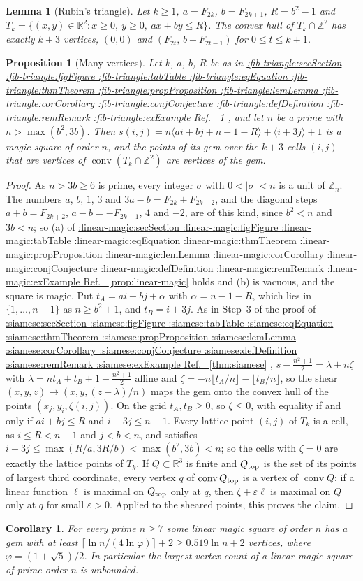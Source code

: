 \documentclass[11pt,a4paper]{article}
\makeatletter
\def\Cref@getprefix#1:#2\relax{#1}
\def\Cref@prefix@sec{sec}
\def\Cref@prefix@fig{fig}
\def\Cref@prefix@tab{tab}
\def\Cref@prefix@eq{eq}
\def\Cref@prefix@thm{thm}
\def\Cref@prefix@prop{prop}
\def\Cref@prefix@lem{lem}
\def\Cref@prefix@cor{cor}
\def\Cref@prefix@conj{conj}
\def\Cref@prefix@def{def}
\def\Cref@prefix@rem{rem}
\def\Cref@prefix@ex{ex}
\def\Cref@type@cap#1{%
  \edef\Cref@tmp{#1}%
  \ifx\Cref@tmp\Cref@prefix@sec Section%
  \else\ifx\Cref@tmp\Cref@prefix@fig Figure%
  \else\ifx\Cref@tmp\Cref@prefix@tab Table%
  \else\ifx\Cref@tmp\Cref@prefix@eq Equation%
  \else\ifx\Cref@tmp\Cref@prefix@thm Theorem%
  \else\ifx\Cref@tmp\Cref@prefix@prop Proposition%
  \else\ifx\Cref@tmp\Cref@prefix@lem Lemma%
  \else\ifx\Cref@tmp\Cref@prefix@cor Corollary%
  \else\ifx\Cref@tmp\Cref@prefix@conj Conjecture%
  \else\ifx\Cref@tmp\Cref@prefix@def Definition%
  \else\ifx\Cref@tmp\Cref@prefix@rem Remark%
  \else\ifx\Cref@tmp\Cref@prefix@ex Example%
  \else Ref.%
  \fi\fi\fi\fi\fi\fi\fi\fi\fi\fi\fi\fi
}
\DeclareRobustCommand{\Cref}[1]{%
  \begingroup
  \edef\Cref@label{#1}%
  \edef\Cref@prefix{\expandafter\Cref@getprefix\Cref@label:\relax}%
  \hyperref[#1]{\Cref@type@cap{\Cref@prefix}~\ref*{#1}}%
  \endgroup
}
\theoremstyle{plain}
\newtheorem{lemma}[theorem]{Lemma}
\newtheorem{proposition}[theorem]{Proposition}
\newtheorem{corollary}[theorem]{Corollary}
\theoremstyle{definition}
\theoremstyle{remark}
\newcommand{\R}{\mathbb{R}}
\newcommand{\Z}{\mathbb{Z}}
\makeatother
\begin{document}
\begin{lemma}[Rubin's triangle]
\label{lem:fib-triangle}
Let $k\ge1$, $a=F_{2k}$, $b=F_{2k+1}$, $R=b^2-1$ and $T_k=\{(x,y)\in\R^2:x\ge0,\ y\ge0,\ ax+by\le R\}$.
The convex hull of $T_k\cap\Z^2$ has exactly $k+3$ vertices, $(0,0)$ and $(F_{2t},\,b-F_{2t-1})$ for $0\le t\le k+1$.
\end{lemma}

\begin{proposition}[Many vertices]
\label{prop:many-vertices}
Let $k$, $a$, $b$, $R$ be as in \Cref{lem:fib-triangle}, and let $n$ be a prime with $n>\max(b^2,3b)$.
Then $s(i,j)=n\langle ai+bj+n-1-R\rangle+\langle i+3j\rangle+1$ is a magic square of order $n$, and the points of its gem over the $k+3$ cells $(i,j)$ that are vertices of $\operatorname{conv}(T_k\cap\Z^2)$ are vertices of the gem.
\end{proposition}

\begin{proof}
As $n>3b\ge6$ is prime, every integer $\sigma$ with $0<|\sigma|<n$ is a unit of $\Z_n$.
The numbers $a$, $b$, $1$, $3$ and $3a-b=F_{2k}+F_{2k-2}$, and the diagonal steps $a+b=F_{2k+2}$, $a-b=-F_{2k-1}$, $4$ and $-2$, are of this kind, since $b^2<n$ and $3b<n$; so (a) of \Cref{prop:linear-magic} holds and (b) is vacuous, and the square is magic.
Put $t_A=ai+bj+\alpha$ with $\alpha=n-1-R$, which lies in $\{1,\dots,n-1\}$ as $n\ge b^2+1$, and $t_B=i+3j$.
As in Step~3 of the proof of \Cref{thm:siamese}, $s-\frac{n^2+1}2=\lambda+n\zeta$ with $\lambda=nt_A+t_B+1-\frac{n^2+1}2$ affine and $\zeta=-n\lfloor t_A/n\rfloor-\lfloor t_B/n\rfloor$, so the shear $(x,y,z)\mapsto(x,y,(z-\lambda)/n)$ maps the gem onto the convex hull of the points $(x_j,y_i,\zeta(i,j))$.
On the grid $t_A,t_B\ge0$, so $\zeta\le0$, with equality if and only if $ai+bj\le R$ and $i+3j\le n-1$.
Every lattice point $(i,j)$ of $T_k$ is a cell, as $i\le R<n-1$ and $j<b<n$, and satisfies $i+3j\le\max(R/a,3R/b)<\max(b^2,3b)<n$; so the cells with $\zeta=0$ are exactly the lattice points of $T_k$.
If $Q\subset\R^3$ is finite and $Q_{\rm top}$ is the set of its points of largest third coordinate, every vertex $q$ of $\operatorname{conv}Q_{\rm top}$ is a vertex of $\operatorname{conv}Q$: if a linear function $\ell$ is maximal on $Q_{\rm top}$ only at $q$, then $\zeta+\varepsilon\ell$ is maximal on $Q$ only at $q$ for small $\varepsilon>0$.
Applied to the sheared points, this proves the claim.
\end{proof}

\begin{corollary}
\label{cor:many-vertices}
For every prime $n\ge7$ some linear magic square of order $n$ has a gem with at least $\lceil\ln n/(4\ln\varphi)\rceil+2\ge0.519\ln n+2$ vertices, where $\varphi=(1+\sqrt5)/2$.
In particular the largest vertex count of a linear magic square of prime order $n$ is unbounded.
\end{corollary}
\end{document}
